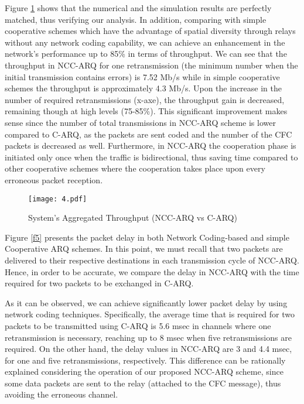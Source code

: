 \documentclass[conference]{IEEEtran}
\begin{document}
Figure \ref{f4} shows that the numerical and the simulation results are perfectly matched, thus verifying our analysis. In addition, comparing with simple cooperative schemes which have the advantage of spatial diversity through relays without any network coding capability, we can achieve an enhancement in the network's performance up to 85\% in terms of throughput. We can see that the throughput in NCC-ARQ for one retransmission (the minimum number when the initial transmission contains errors) is 7.52 Mb/s while in simple cooperative schemes the throughput is approximately 4.3 Mb/s. Upon the increase in the number of required retransmissions (x-axe), the throughput gain is decreased, remaining though at high levels (75-85\%). This significant improvement makes sense since the number of total transmissions in NCC-ARQ scheme is lower compared to C-ARQ, as the packets are sent coded and the number of the CFC packets is decreased as well. Furthermore, in NCC-ARQ the cooperation phase is initiated only once when the traffic is bidirectional, thus saving time compared to other cooperative schemes where the cooperation takes place upon every erroneous packet reception.

\begin{figure}[htb]
\centering
\texttt{[image: 4.pdf]}
\caption{System's Aggregated Throughput (NCC-ARQ vs C-ARQ)}\label{f4}
\end{figure}

Figure \ref{f5} presents the packet delay in both Network Coding-based and simple Cooperative ARQ schemes. In this point, we must recall that two packets are delivered to their respective destinations in each transmission cycle of NCC-ARQ. Hence, in order to be accurate, we compare the delay in NCC-ARQ with the time required for two packets to be exchanged in C-ARQ.

As it can be observed, we can achieve significantly lower packet delay by using network coding techniques. Specifically, the average time that is required for two packets to be transmitted using C-ARQ is 5.6 msec in channels where one retransmission is necessary, reaching up to 8 msec when five retransmissions are required. On the other hand, the delay values in NCC-ARQ are 3 and 4.4 msec, for one and five retransmissions, respectively. This difference can be rationally explained considering the operation of our proposed NCC-ARQ scheme, since some data packets are sent to the relay (attached to the CFC message), thus avoiding the erroneous channel.
\end{document}
